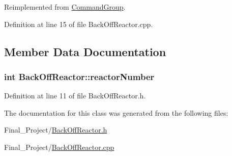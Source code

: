 Reimplemented from \hyperlink{classCommandGroup_a99800c5dbd05ab750aa0bb27518d0467}{Command\-Group}.



Definition at line 15 of file Back\-Off\-Reactor.\-cpp.



\subsection{Member Data Documentation}
\hypertarget{classBackOffReactor_ae5b8f5714a059f48405fd6ab7b3de851}{
\subsubsection[{reactor\-Number}]{\setlength{\rightskip}{0pt plus 5cm}int Back\-Off\-Reactor\-::reactor\-Number\hspace{0.3cm}{\ttfamily [private]}}}\label{classBackOffReactor_ae5b8f5714a059f48405fd6ab7b3de851}


Definition at line 11 of file Back\-Off\-Reactor.\-h.



The documentation for this class was generated from the following files\-:\begin{DoxyCompactItemize}
\item 
Final\-\_\-\-Project/\hyperlink{BackOffReactor_8h}{Back\-Off\-Reactor.\-h}\item 
Final\-\_\-\-Project/\hyperlink{BackOffReactor_8cpp}{Back\-Off\-Reactor.\-cpp}\end{DoxyCompactItemize}
